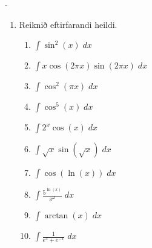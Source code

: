 \begin{adjustwidth}{-\hangingaefingar}{}
\begin{enumerate}
\item Reiknið eftirfarandi heildi.
\begin{multicols}{2}
\begin{enumerate}
\setlength\itemsep{4mm}
\item $\displaystyle \int \sin^{2}(x) \; dx$
\item $\displaystyle \int x\cos(2\pi x)\sin(2\pi x) \; dx$
\item $\displaystyle \int \cos^{2}(\pi x) \; dx$
\item $\displaystyle \int \cos^{5}(x) \; dx$
\item $\displaystyle \int 2^{x}\cos(x) \; dx$
\item $\displaystyle \int \sqrt{x}\sin\left(\sqrt{x}\right) \; dx$ 
\item $\displaystyle \int \cos(\ln(x)) \; dx$
\item $\displaystyle \int \frac{5^{\ln(x)}}{x^{2}}\; dx$
\item $\displaystyle \int \arctan(x) \; dx$
\item $\displaystyle \int \frac{1}{e^{x}+e^{-x}} \; dx$
\end{enumerate}
\end{multicols}

\end{enumerate}
\end{adjustwidth}

\fi

\if {}
{\if {} \newpage \fi}
\fi


